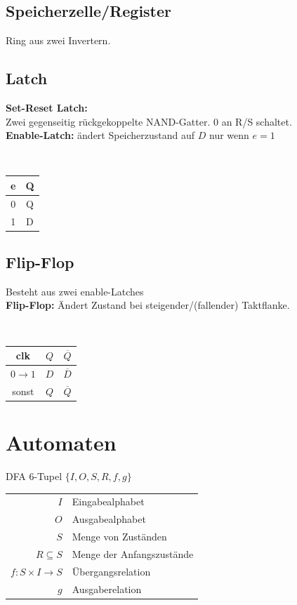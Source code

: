 \documentclass[6pt,a4paper]{scrartcl}
\renewcommand{\emph}[1]{\textsf{\textbf{#1}}}
\newcommand{\eset}[1]{\ensuremath{\bigl\{#1\bigr\}}}								%
\newcommand{\ol}[1]{\ensuremath{\overline{#1}}}									%
\newcommand{\ra}[0]{\ensuremath{\rightarrow}} 									%
\begin{document}
\begin{multicols*}{3}

	\subsection{Speicherzelle/Register}
	Ring aus zwei Invertern.
	
	\subsection{Latch}
	\parbox{5cm}{
		\emph{Set-Reset Latch:} \\ Zwei gegenseitig rückgekoppelte NAND-Gatter. $0$ an R/S schaltet.
		\\	\emph{Enable-Latch:} ändert Speicherzustand auf $D$ nur wenn $e=1$
	}
	\parbox{.5cm}{\ }
	\parbox{2cm}{
		\begin{tabular}{c|c} e & Q \\ \hline 0 & Q \\ 1 & D \end{tabular}
	}
	

	\subsection{Flip-Flop}
		\parbox{5cm}{
			Besteht aus zwei enable-Latches \\
			\emph{Flip-Flop:} Ändert Zustand bei steigender/(fallender) Taktflanke.\\
		}
		\parbox{.5cm}{\ }
		\parbox{2cm}{
			\begin{tabular}{c|c|c} clk & $Q$ & $\ol Q$ \\ \hline $0 \ra 1$ & $D$ & $\ol D$ \\ sonst & $Q$ & $\ol Q$ \end{tabular}
		}


\section{Automaten} %

DFA 6-Tupel $\eset{I, O, S, R, f, g}$ \\

\begin{tabular}{r | l} 
$I$ & Eingabealphabet \\
$O$ &  Ausgabealphabet \\
$S$ & Menge von Zuständen \\
$R \subseteq S$ &  Menge der Anfangszustände \\
$f: S \times I \ra S$  &  Übergangsrelation \\
$g$ & Ausgaberelation \\
\end{tabular}


\end{multicols*}
\end{document}
